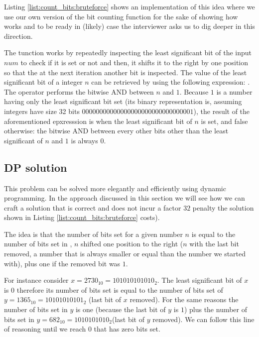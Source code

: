 Listing \ref{list:count_bits:bruteforce} shows an implementation of this
idea where we use our own version of the bit counting function  for the sake of
showing how  works and to be ready in (likely) case the  interviewer asks us to dig deeper in this direction.

The tunction  works by repeatedly inspecting
the least significant bit of the input $num$ to check if it is set or not and then, it shifts it to the right by one position so that the at the next iteration another bit is inspected. The value of the least significant  bit of a integer $n$ can be retrieved by using the following expression: . The operator \inline{&} performs the bitwise AND between $n$ and $1$. Because $1$ is a number having only the least significant bit set (its binary representation is, assuming integers have size 32 bits $00000000000000000000000000000001$), the result of the aforementioned epxresssion is  when the least significant bit of $n$ is set, and false otherwise: the bitwise AND between every other bits other than the least significant of $n$ and $1$ is always $0$.



\subsection{DP solution}
\label{count_bits:sec:dp}
This problem can be solved more elegantly and efficiently using dynamic programming. In the approach discussed in this section we will see how we can craft a solution that is correct and does not incur a factor $32$ penalty the solution shown in Listing \ref{list:count_bits:bruteforce} costs).

The idea is that the number of bits set for a given number $n$ is equal to the number of bits set in , $n$ shifted one position to the right ($n$ with the last bit removed, a number that is always smaller or equal than
the number we started with), plus one if the removed bit was $1$.

For instance consider $x=2730_{10} = 101010101010_2$. The least significant bit of $x$ is $0$
therefore its number of bits set is equal to the number of bits set of $y=1365_{10} = 10101010101_2$
(last bit of $x$ removed). 
For the same reasons the number of bits set in $y$ is one (because the last bit of $y$ is $1$) plus the number of bits set in $y=682_{10} = 1010101010_2$(last bit of $y$ removed). We can follow
this line of reasoning until we reach $0$ that has zero bits set.

